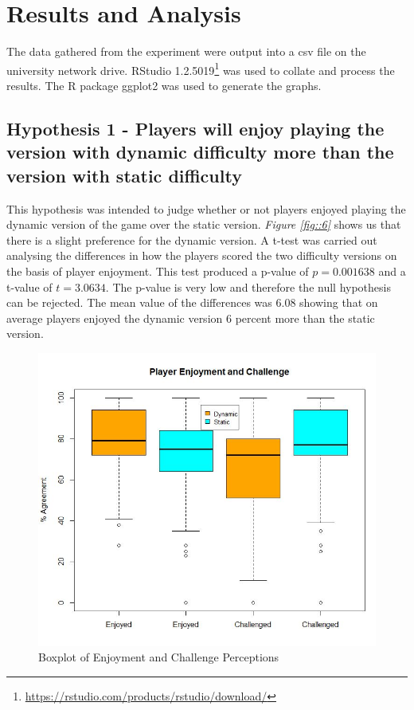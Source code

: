 \documentclass[journal]{IEEEtran}
\begin{document}
\section{Results and Analysis}

The data gathered from the experiment were output into a csv file on the university network drive. RStudio 1.2.5019\footnote{\url{https://rstudio.com/products/rstudio/download/}} was used to collate and process the results. The R package ggplot2 was used to generate the graphs.

\subsection{Hypothesis 1 - Players will enjoy playing the version with dynamic difficulty more than the version with static difficulty}

This hypothesis was intended to judge whether or not players enjoyed playing the dynamic version of the game over the static version. \textit{Figure \ref{fig::6}} shows us that there is a slight preference for the dynamic version. A t-test was carried out analysing the differences in how the players scored the two difficulty versions on the basis of player enjoyment. This test produced a p-value of $p = 0.001638$ and a t-value of $t = 3.0634$. The p-value is very low and therefore the null hypothesis can be rejected. The mean value of the differences was 6.08 showing that on average players enjoyed the dynamic version 6 percent more than the static version.


\begin{figure}[h]
	\includegraphics[width=1.0\linewidth]{playerenjoymentandchallenge.jpg}
	\caption{Boxplot of Enjoyment and Challenge Perceptions}
	\label{fig::5}
\end{figure} 
\end{document}
